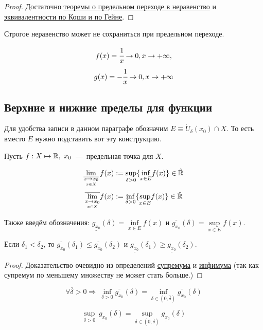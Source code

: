 \begin{proof}
    Достаточно \hyperlink{thm2.3}{теоремы о предельном переходе в неравенство} и \hyperlink{thm4.3}{эквивалентности по Коши и по Гейне}.
\end{proof}

\begin{note}
    Строгое неравенство может не сохраниться при предельном переходе.
\end{note}
\begin{example}
    $$f(x) = \cfrac{1}{x} \to 0, x\to +\infty,$$
    $$ g(x) = -\cfrac{1}{x} \to 0, x\to +\infty$$
\end{example}

\subsection{Верхние и нижние пределы для функции}

Для удобства записи в данном параграфе обозначим $E \equiv    \mathring{U}_{\delta} (x_{0}) \cap X$. То есть вместо $E$ нужно подставить вот эту конструкцию.
\begin{definition}
    Пусть  $f: X \mapsto \mathbb{R},\  x_{0}$~---~предельная точка для $X$. 
   
    $$ \lim\limits_{\overline{\underset{x \in X}{x\to x_0}}} f(x) := \underset{\delta > 0}{\sup}\{ \underset{x\in E}{\inf} f(x)\} \in \Hat{\mathbb{R}} $$
    $$ \overline{\lim\limits_{\underset{x \in X}{x\to x_0}}} f(x) := \underset{\delta > 0}{\inf}\{ \underset{x\in E}{\sup} f(x) \} \in \Hat{\mathbb{R}}$$

    Также введём обозначения: $\underline{g_{x_{0}}} (\delta) = \underset{x\in E}{\inf} f (x)$ и $\overline{g_{x_{0}}} (\delta) = \underset{x\in E}{\sup} f (x).$
    
\end{definition}

\begin{lemma}
     Если $\delta_{1} <\delta_{2}$, то $\overline{g_{x_{0}}}(\delta_{1}) \leq \overline{g_{x_{0}}} (\delta_{2})$ и $\underline{g_{x_{0}}}(\delta_{1}) \geq \underline{g_{x_{0}}} (\delta_{2})$.
\end{lemma}

\begin{proof}
    Доказательство очевидно из определений \hyperlink{def1.23}{супремума} и \hyperlink{def1.25}{инфимума} (так как супремум по меньшему множеству не может стать больше.)
\end{proof}

\begin{lemma}
    \hypertarget{lemm4.6}{}
    $$\forall \overline{\delta} > 0 \Rightarrow \ \underset{\delta > 0}{\inf} \overline{g_{x_{0}}}(\delta) = \underset{\delta \in (0, \overline{\delta}) }{\inf} \overline{g_{x_{0}}}(\delta)$$

    $$\underset{\delta > 0}{\sup}\  \underline{g_{x_{0}}}(\delta) = \underset{\delta \in (0, \overline{\delta}) }{\sup} \underline{g_{x_{0}}}(\delta)$$
\end{lemma}

